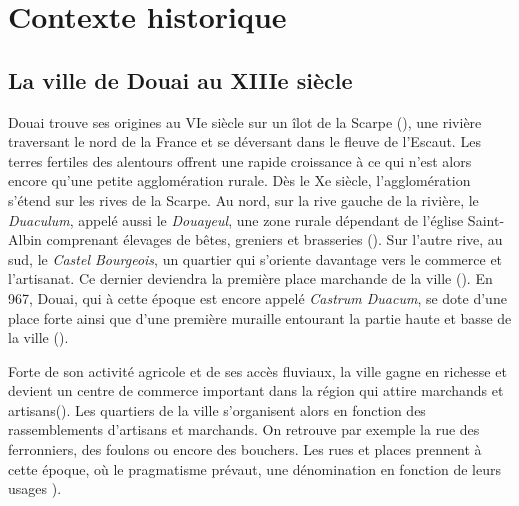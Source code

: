 
\section{Contexte historique}
\subsection{La ville de Douai au XIIIe siècle}

Douai trouve ses origines au VIe siècle sur un îlot de la Scarpe (\cite{mestayer_douai_2016}), une rivière traversant le nord de la France et se déversant dans le fleuve de l'Escaut. Les terres fertiles des alentours offrent une rapide croissance à ce qui n'est alors encore qu'une petite agglomération rurale. Dès le Xe siècle, l'agglomération s'étend sur les rives de la Scarpe. Au nord, sur la rive gauche de la rivière, le \textit{Duaculum}, appelé aussi le \textit{Douayeul}, une zone rurale dépendant de l'église Saint-Albin comprenant élevages de bêtes, greniers et brasseries (\cite{mestayer_douai_2016}). Sur l'autre rive, au sud, le \textit{Castel Bourgeois}, un quartier qui s'oriente davantage vers le commerce et l'artisanat. Ce dernier deviendra la première place marchande de la ville (\cite{netteghem_histoire_2021}). En 967, Douai, qui à cette époque est encore appelé \textit{Castrum Duacum}, se dote d'une place forte ainsi que d'une première muraille entourant la partie haute et basse de la ville (\cite{mestayer_douai_2016}). 

Forte de son activité agricole et de ses accès fluviaux, la ville gagne en richesse et devient un centre de commerce important dans la région qui attire marchands et artisans(\cite{clisant_vie_2003}). Les quartiers de la ville s'organisent alors en fonction des rassemblements d'artisans et marchands. On retrouve par exemple la rue des ferronniers, des foulons ou encore des bouchers. Les rues et places prennent à cette époque, où le pragmatisme  prévaut, une dénomination en fonction de leurs usages \cite{colin_decouvrez_2001}). 

